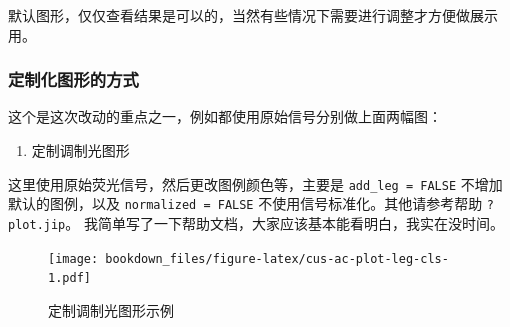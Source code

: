 \documentclass[
]{krantz}
\makeatletter
\newenvironment{Shaded}{\begin{snugshade}}{\end{snugshade}}
\newcommand{\AttributeTok}[1]{\textcolor[rgb]{0.77,0.63,0.00}{#1}}
\newcommand{\ConstantTok}[1]{\textcolor[rgb]{0.00,0.00,0.00}{#1}}
\newcommand{\DecValTok}[1]{\textcolor[rgb]{0.00,0.00,0.81}{#1}}
\newcommand{\FloatTok}[1]{\textcolor[rgb]{0.00,0.00,0.81}{#1}}
\newcommand{\FunctionTok}[1]{\textcolor[rgb]{0.00,0.00,0.00}{#1}}
\newcommand{\NormalTok}[1]{#1}
\newcommand{\OtherTok}[1]{\textcolor[rgb]{0.56,0.35,0.01}{#1}}
\newcommand{\SpecialCharTok}[1]{\textcolor[rgb]{0.00,0.00,0.00}{#1}}
\newcommand{\StringTok}[1]{\textcolor[rgb]{0.31,0.60,0.02}{#1}}
\providecommand{\tightlist}{%
  \setlength{\itemsep}{0pt}\setlength{\parskip}{0pt}}
\newenvironment{kframe}{%
\medskip{}
\setlength{\fboxsep}{.8em}
 \def\at@end@of@kframe{}%
 \ifinner\ifhmode%
  \def\at@end@of@kframe{\end{minipage}}%
  \begin{minipage}{\columnwidth}%
 \fi\fi%
 \def\FrameCommand##1{\hskip\@totalleftmargin \hskip-\fboxsep
 \colorbox{shadecolor}{##1}\hskip-\fboxsep
     \hskip-\linewidth \hskip-\@totalleftmargin \hskip\columnwidth}%
 \MakeFramed {\advance\hsize-\width
   \@totalleftmargin\z@ \linewidth\hsize
   \@setminipage}}%
 {\par\unskip\endMakeFramed%
 \at@end@of@kframe}
\renewenvironment{Shaded}{\begin{kframe}}{\end{kframe}}
\makeatother
\begin{document}
默认图形，仅仅查看结果是可以的，当然有些情况下需要进行调整才方便做展示用。

\hypertarget{customized-plot-jiptest}{%
\subsubsection{定制化图形的方式}\label{customized-plot-jiptest}}

这个是这次改动的重点之一，例如都使用原始信号分别做上面两幅图：

\begin{enumerate}
\def\labelenumi{\arabic{enumi}.}
\tightlist
\item
  定制调制光图形
\end{enumerate}

这里使用原始荧光信号，然后更改图例颜色等，主要是 \texttt{add\_leg\ =\ FALSE} 不增加默认的图例，以及 \texttt{normalized\ =\ FALSE} 不使用信号标准化。其他请参考帮助 \texttt{?plot.jip}。 我简单写了一下帮助文档，大家应该基本能看明白，我实在没时间。

\begin{Shaded}
\end{Shaded}

\begin{figure}
\centering
\texttt{[image: bookdown\_files/figure-latex/cus-ac-plot-leg-cls-1.pdf]}
\caption{\label{fig:cus-ac-plot-leg-cls}定制调制光图形示例}
\end{figure}
\end{document}
